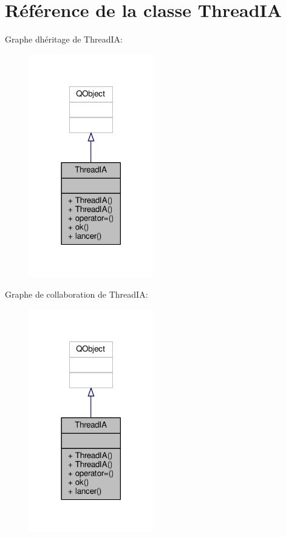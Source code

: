 \hypertarget{classThreadIA}{}\section{Référence de la classe Thread\+IA}
\label{classThreadIA}


Graphe d\textquotesingle{}héritage de Thread\+IA\+:
\nopagebreak
\begin{figure}[H]
\begin{center}
\leavevmode
\includegraphics[width=153pt]{classThreadIA__inherit__graph}
\end{center}
\end{figure}


Graphe de collaboration de Thread\+IA\+:
\nopagebreak
\begin{figure}[H]
\begin{center}
\leavevmode
\includegraphics[width=153pt]{classThreadIA__coll__graph}
\end{center}
\end{figure}
